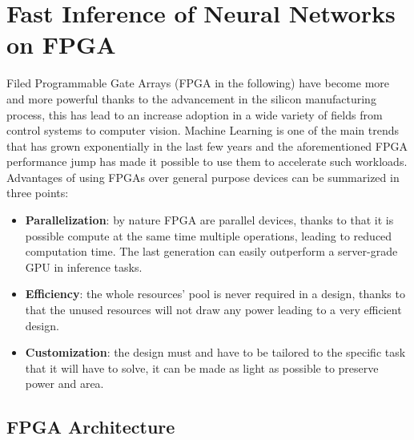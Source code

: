 \documentclass[../../main.tex]{subfiles}
\begin{document}
    
    \chapter{Fast Inference of Neural Networks on FPGA}
    \label{sec:FPGA_NN}
    
Filed Programmable Gate Arrays (FPGA in the following) have become more and more powerful thanks to the advancement in the silicon manufacturing process, this has lead to an increase adoption in a wide variety of fields from control systems to computer vision.  
Machine Learning is one of the main trends that has grown exponentially in the last few years and the aforementioned FPGA performance jump has made it possible to use them to accelerate such workloads.  
Advantages of using FPGAs over general purpose devices can be summarized in three points:  
\begin{itemize}
    \item \textbf{Parallelization}: by nature FPGA are parallel devices, thanks to that it is possible compute at the same time multiple operations, leading to reduced computation time. The last generation can easily outperform a server-grade GPU in inference tasks\cite{FPGA-inf}.
    \item \textbf{Efficiency}: the whole resources' pool is never required in a design, thanks to that the unused resources will not draw any power leading to a very efficient design.  
    \item \textbf{Customization}: the design must and have to be tailored to the specific task that it will have to solve, it can be made as light as possible to preserve power and area.  
\end{itemize}
    
    
\section{FPGA Architecture}
\label{sec:FPGA_struct}
\end{document}
